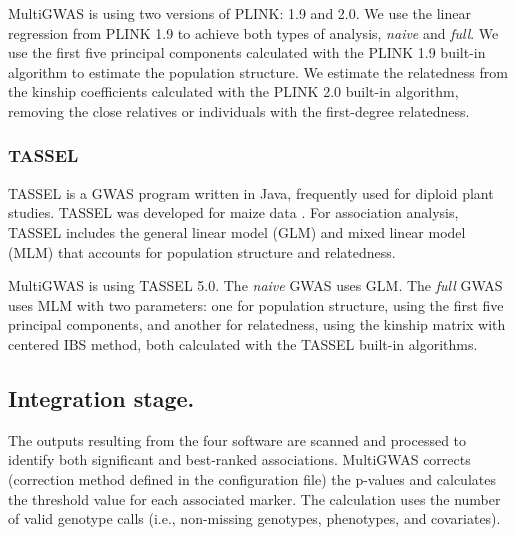 MultiGWAS is using two versions of PLINK: 1.9 and 2.0. We use the linear regression from PLINK 1.9 to achieve both types of analysis, \emph{naive} and \emph{full}. We use the first five principal components calculated with the PLINK 1.9 built-in algorithm to estimate the population structure. We estimate the relatedness from the kinship coefficients calculated with the PLINK 2.0 built-in algorithm, removing the close relatives or individuals with the first-degree relatedness.

\subsubsection{TASSEL}

TASSEL  \cite{Bradbury2007}  is a GWAS program written in Java, frequently used for diploid plant studies. TASSEL was developed for maize data \cite{Alvarez2017,Zhang2018}. For association analysis, TASSEL includes the general linear model (GLM) and mixed linear model (MLM) that accounts for population structure and relatedness.

MultiGWAS is using TASSEL 5.0. The \emph{naive} GWAS uses GLM. The \emph{full} GWAS uses MLM with two parameters: one for population structure, using the first five principal components, and another for relatedness, using the kinship matrix with centered IBS method, both calculated with the TASSEL built-in algorithms.


\subsection{Integration stage.} The outputs resulting from the four software are scanned and processed to identify both significant and best-ranked associations. MultiGWAS corrects (correction method defined in the configuration file) the p-values and calculates the threshold value for each associated marker. The calculation uses the number of valid genotype calls (i.e., non-missing genotypes, phenotypes, and covariates). 

